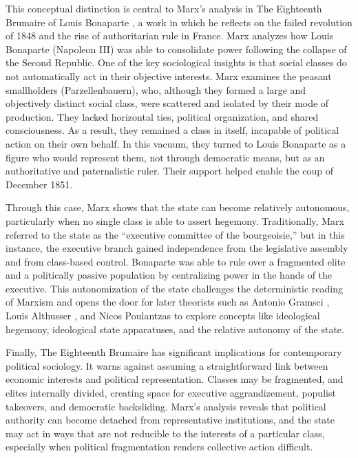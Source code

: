 \documentclass[12pt]{article}
\begin{document}
This conceptual distinction is central to Marx’s analysis in The Eighteenth Brumaire of Louis Bonaparte \citep{Marx1869}, a work in which he reflects on the failed revolution of 1848 and the rise of authoritarian rule in France. Marx analyzes how Louis Bonaparte (Napoleon III) was able to consolidate power following the collapse of the Second Republic. One of the key sociological insights is that social classes do not automatically act in their objective interests. Marx examines the peasant smallholders (Parzellenbauern), who, although they formed a large and objectively distinct social class, were scattered and isolated by their mode of production. They lacked horizontal ties, political organization, and shared consciousness. As a result, they remained a class in itself, incapable of political action on their own behalf. In this vacuum, they turned to Louis Bonaparte as a figure who would represent them, not through democratic means, but as an authoritative and paternalistic ruler. Their support helped enable the coup of December 1851.

Through this case, Marx shows that the state can become relatively autonomous, particularly when no single class is able to assert hegemony. Traditionally, Marx referred to the state as the “executive committee of the bourgeoisie,” but in this instance, the executive branch gained independence from the legislative assembly and from class-based control. Bonaparte was able to rule over a fragmented elite and a politically passive population by centralizing power in the hands of the executive. This autonomization of the state challenges the deterministic reading of Marxism and opens the door for later theorists such as Antonio Gramsci \citep{gramsci1971prison}, Louis Althusser \citep{althusser1977ideologie}, and Nicos Poulantzas \citep{poulantzas1975political} to explore concepts like ideological hegemony, ideological state apparatuses, and the relative autonomy of the state.

Finally, The Eighteenth Brumaire has significant implications for contemporary political sociology. It warns against assuming a straightforward link between economic interests and political representation. Classes may be fragmented, and elites internally divided, creating space for executive aggrandizement, populist takeovers, and democratic backsliding. Marx’s analysis reveals that political authority can become detached from representative institutions, and the state may act in ways that are not reducible to the interests of a particular class, especially when political fragmentation renders collective action difficult.
\end{document}
